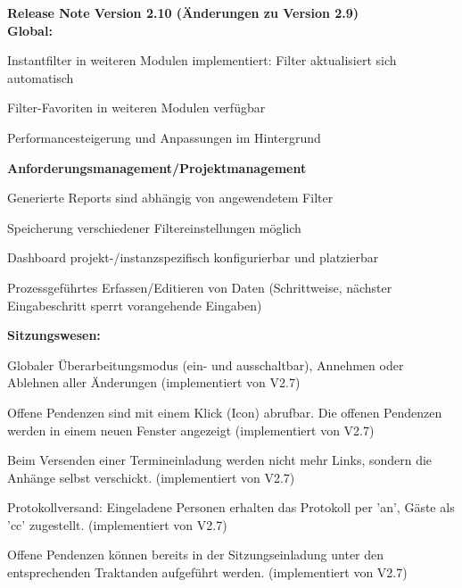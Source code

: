 \vspace{\baselineskip}
\textbf{Release Note Version 2.10 (Änderungen zu Version 2.9)} \\
\textbf{Global:}
\begin{compactitem}
	\item Instantfilter in weiteren Modulen implementiert: Filter aktualisiert sich automatisch 
	\item Filter-Favoriten in weiteren Modulen verfügbar
	\item Performancesteigerung und Anpassungen im Hintergrund
\end{compactitem}
\textbf{Anforderungsmanagement/Projektmanagement}
\begin{compactitem}
	\item Generierte Reports sind abhängig von angewendetem Filter
	\item Speicherung verschiedener Filtereinstellungen möglich
	\item Dashboard projekt-/instanzspezifisch konfigurierbar und platzierbar
	\item Prozessgeführtes Erfassen/Editieren von Daten (Schrittweise, nächster Eingabeschritt sperrt vorangehende Eingaben)
\end{compactitem}
\textbf{Sitzungswesen:}
\begin{compactitem}
	\item Globaler Überarbeitungsmodus (ein- und ausschaltbar), Annehmen oder Ablehnen aller Änderungen (implementiert von V2.7)
	\item Offene Pendenzen sind  mit einem Klick (Icon) abrufbar. Die offenen Pendenzen werden in einem neuen Fenster angezeigt (implementiert von V2.7)
	\item Beim Versenden einer Termineinladung werden nicht mehr Links, sondern die Anhänge selbst verschickt. (implementiert von V2.7)
	\item Protokollversand: Eingeladene Personen erhalten das Protokoll per 'an', Gäste als 'cc' zugestellt. (implementiert von V2.7)
	\item Offene Pendenzen können bereits in der Sitzungseinladung unter den entsprechenden Traktanden aufgeführt werden. (implementiert von V2.7)
\end{compactitem}


\vspace{\baselineskip}

